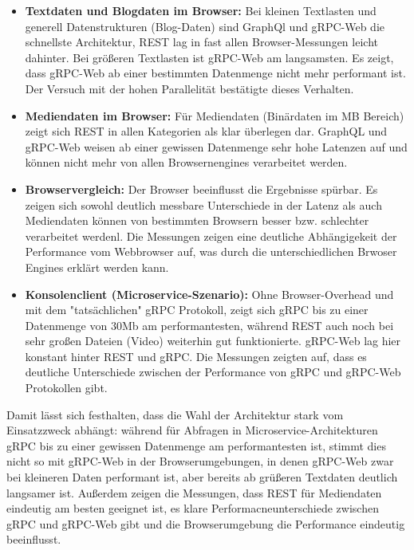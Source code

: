 \begin{itemize}
	\item \textbf{Textdaten und Blogdaten im Browser:} Bei kleinen Textlasten und generell Datenstrukturen (Blog-Daten) sind GraphQl und gRPC-Web die schnellste Architektur, REST lag in fast allen Browser-Messungen leicht dahinter. Bei größeren Textlasten ist gRPC-Web am langsamsten. Es zeigt, dass gRPC-Web ab einer bestimmten Datenmenge nicht mehr performant ist. Der Versuch mit der hohen Parallelität bestätigte dieses Verhalten.
	\item \textbf{Mediendaten im Browser:} Für Mediendaten (Binärdaten im MB Bereich) zeigt sich REST in allen Kategorien als klar überlegen dar. GraphQL und gRPC-Web weisen ab einer gewissen Datenmenge sehr hohe Latenzen auf und können nicht mehr von allen Browsernengines verarbeitet werden.
	
	\item \textbf{Browservergleich:} Der Browser beeinflusst die Ergebnisse spürbar. Es zeigen sich sowohl deutlich messbare Unterschiede in der Latenz als auch Mediendaten können von bestimmten Browsern besser bzw. schlechter verarbeitet werdenl. Die Messungen zeigen eine deutliche Abhängigekeit der Performance vom Webbrowser auf, was durch die unterschiedlichen Brwoser Engines erklärt werden kann.
	
	\item \textbf{Konsolenclient (Microservice-Szenario):} Ohne Browser-Overhead und mit dem "tatsächlichen" gRPC Protokoll, zeigt sich gRPC bis zu einer Datenmenge von 30Mb am performantesten, während REST auch noch bei sehr großen Dateien (Video) weiterhin gut funktionierte. gRPC-Web lag hier konstant hinter REST und gRPC. Die Messungen zeigten auf, dass es deutliche Unterschiede zwischen der Performance von gRPC und gRPC-Web Protokollen gibt.
\end{itemize}

Damit lässt sich festhalten, dass die Wahl der Architektur stark vom Einsatzzweck abhängt: während für Abfragen in Microservice-Architekturen gRPC bis zu einer gewissen Datenmenge am performantesten ist, stimmt dies nicht so mit gRPC-Web in der Browserumgebungen, in denen gRPC-Web zwar bei kleineren Daten performant ist, aber bereits ab grüßeren Textdaten deutlich langsamer ist. Außerdem zeigen die Messungen, dass REST für Mediendaten eindeutig am besten geeignet ist, es klare Performacneunterschiede zwischen gRPC und gRPC-Web gibt und die Browserumgebung die Performance eindeutig beeinflusst.

\chapterend